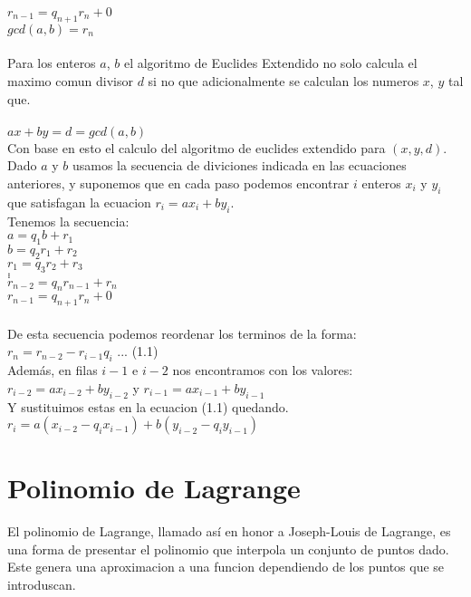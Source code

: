$r_{n-1}=q_{n+1}r_n+0$\\
$gcd(a,b)=r_n$\\\\
Para los enteros $a$, $b$ el algoritmo de Euclides Extendido no solo calcula el maximo comun divisor $d$ si no que adicionalmente se calculan los numeros $x$, $y$ tal que.\\\\
$ax+by=d=gcd(a,b)$\\
Con base en esto el calculo del algoritmo de euclides extendido para $(x,y,d)$. Dado  $a$ y $b$ usamos la secuencia de diviciones indicada en las ecuaciones anteriores, y suponemos que en cada paso podemos encontrar $i$ enteros $x_i$ y $y_i$ que satisfagan la ecuacion $r_i=ax_i+by_i$.\\
Tenemos la secuencia:\\
$a=q_1b+r_1$\\
$b=q_2r_1+r_2$\\
$r_1=q_3r_2+r_3$\\
$.$\\
$.$\\
$.$\\
$r_{n-2}=q_nr_{n-1}+r_n$\\
$r_{n-1}=q_{n+1}r_n+0$\\\\
De esta secuencia podemos reordenar los terminos de la forma:\\
$r_n=r_{n-2}-r_{i-1}q_i$ ... (1.1)\\
Además, en filas $i-1$ e $i-2$ nos encontramos con los valores:\\
$r_{i-2}=ax_{i-2}+by_{i-2}$ y $r_{i-1}=ax_{i-1}+by_{i-1}$\\
Y sustituimos estas en la ecuacion (1.1) quedando.\\
$r_i=a(x_{i-2}-q_ix_{i-1})+b(y_{i-2}-q_iy_{i-1})$
\cite{modes}\\

\section{Polinomio de Lagrange}
 El polinomio de Lagrange, llamado así en honor a Joseph-Louis de Lagrange, es una forma de presentar el polinomio que interpola un conjunto de puntos dado. Este genera una aproximacion a una funcion dependiendo de los puntos que se introduscan.\cite{stinson}\\\\
 
